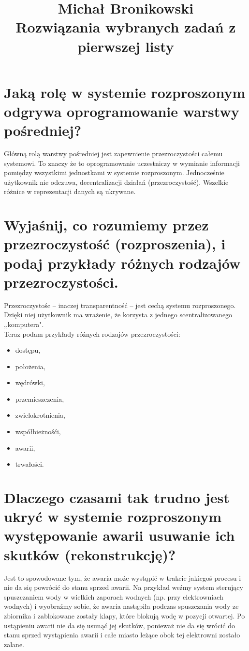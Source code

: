\documentclass[10pt,a4paper]{article}
\title{Michał Bronikowski \protect\\ Rozwiązania wybranych zadań z pierwszej listy}
\begin{document}
\maketitle
\thispagestyle{empty}
\newpage
\section{\normalsize{Jaką rolę w systemie rozproszonym odgrywa oprogramowanie warstwy pośredniej?}}
Główną rolą warstwy pośredniej jest zapewnienie przezroczystości całemu systemowi. To znaczy że
to oprogramowanie uczestniczy w wymianie informacji pomiędzy wszystkimi jednostkami w systemie rozproszonym.
Jednocześnie użytkownik nie odczuwa, decentralizacji działań (przezroczystość). Wszelkie różnice w reprezentacji danych są ukrywane.
\section{\normalsize{Wyjaśnij, co rozumiemy przez przezroczystość (rozproszenia), i podaj przykłady różnych rodzajów przezroczystości.}}
Przezroczystośc -- inaczej transparentność -- jest cechą systemu rozproszonego. Dzięki niej użytkownik ma wrażenie, że korzysta z jednego scentralizowanego ,,komputera". \\
Teraz podam przykłady różnych rodzajów przezroczystości:
\begin{itemize}
\item {dostępu,}
\item {położenia,}
\item {wędrówki,}
\item {przemieszczenia,}
\item {zwielokrotnienia,}
\item {współbieżnośći,}
\item {awarii,}
\item {trwałości.}
\end{itemize}
\section{\normalsize{Dlaczego czasami tak trudno jest ukryć w systemie rozproszonym występowanie awarii usuwanie ich skutków (rekonstrukcję)?}}
Jest to spowodowane tym, że awaria może wystąpić w trakcie jakiegoś procesu i nie da się powrócić do stanu sprzed awarii.
Na przykład weźmy system sterujący spuszczaniem wody w wielkich zaporach wodnych (np. przy elektrowniach wodnych) i wyobraźmy sobie, że awaria nastąpiła podczas spuszczania wody ze zbiornika i zablokowane zostały klapy, które blokują wodę w pozycji otwartej. Po ustąpieniu awarii nie da się usunąć jej skutków, ponieważ nie da się wrócić do stanu sprzed wystąpienia awarii i całe miasto leżące obok tej elektrowni zostało zalane.
\end{document}
